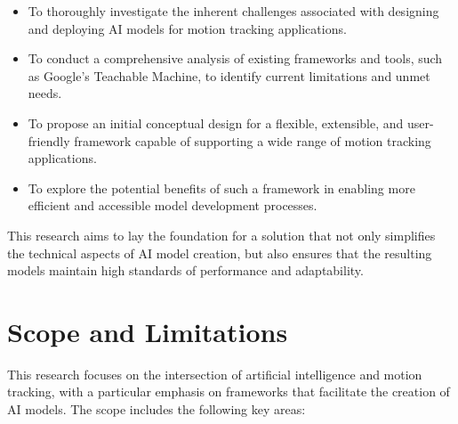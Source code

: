 \begin{itemize}
\item To thoroughly investigate the inherent challenges associated with designing and deploying AI models for motion tracking applications.

\item To conduct a comprehensive analysis of existing frameworks and tools, such as Google's Teachable Machine, to identify current limitations and unmet needs.

\item To propose an initial conceptual design for a flexible, extensible, and user-friendly framework capable of supporting a wide range of motion tracking applications.

\item To explore the potential benefits of such a framework in enabling more efficient and accessible model development processes.

\end{itemize}

This research aims to lay the foundation for a solution that not only simplifies the technical aspects of AI model creation, but also ensures that the resulting models maintain high standards of performance and adaptability.

\section{Scope and Limitations}


This research focuses on the intersection of artificial intelligence and motion tracking, with a particular emphasis on frameworks that facilitate the creation of AI models. The scope includes the following key areas:

